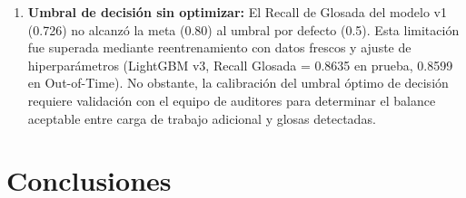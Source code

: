 \documentclass[12pt,letterpaper]{report}
\begin{document}
\begin{enumerate}
    \item \textbf{Umbral de decisión sin optimizar:} El Recall de Glosada del modelo v1 (0.726) no alcanzó la meta (0.80) al umbral por defecto (0.5). Esta limitación fue superada mediante reentrenamiento con datos frescos y ajuste de hiperparámetros (LightGBM v3, Recall Glosada = 0.8635 en prueba, 0.8599 en Out-of-Time). No obstante, la calibración del umbral óptimo de decisión requiere validación con el equipo de auditores para determinar el balance aceptable entre carga de trabajo adicional y glosas detectadas.
\end{enumerate}

\chapter{Conclusiones}
\end{document}
